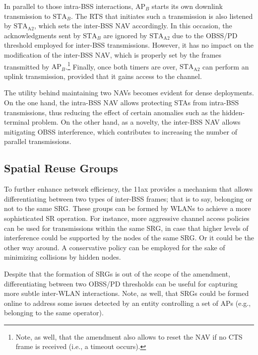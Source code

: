 \documentclass[preprint,12pt]{elsarticle}
\begin{document}
	
	In parallel to those intra-BSS interactions, $\text{AP}_B$ starts its own downlink transmission to $\text{STA}_B$. The RTS that initiates such a transmission is also listened by $\text{STA}_\text{A2}$, which sets the inter-BSS NAV accordingly. In this occasion, the acknowledgments sent by $\text{STA}_B$ are ignored by $\text{STA}_\text{A2}$ due to the OBSS/PD threshold employed for inter-BSS transmissions. However, it has no impact on the modification of the inter-BSS NAV, which is properly set by the frames transmitted by $\text{AP}_B$.\footnote{Note, as well, that the amendment also allows to reset the NAV if no CTS frame is received (i.e., a timeout occurs).} Finally, once both timers are over, $\text{STA}_\text{A2}$ can perform an uplink transmission, provided that it gains access to the channel.
	
	The utility behind maintaining two NAVs becomes evident for dense deployments. On the one hand, the intra-BSS NAV allows protecting STAs from intra-BSS transmissions, thus reducing the effect of certain anomalies such as the hidden-terminal problem. On the other hand, as a novelty, the inter-BSS NAV allows mitigating OBSS interference, which contributes to increasing the number of parallel transmissions. 
	
	\subsection{Spatial Reuse Groups}
	\label{section:srg}
	To further enhance network efficiency, the 11ax provides a mechanism that allows differentiating between two types of inter-BSS frames; that is to say, belonging or not to the same SRG. These groups can be formed by WLANs to achieve a more sophisticated SR operation. For instance, more aggressive channel access policies can be used for transmissions within the same SRG, in case that higher levels of interference could be supported by the nodes of the same SRG. Or it could be the other way around. A conservative policy can be employed for the sake of minimizing collisions by hidden nodes. 
	
	Despite that the formation of SRGs is out of the scope of the amendment, differentiating between two OBSS/PD thresholds can be useful for capturing more subtle inter-WLAN interactions. Note, as well, that SRGs could be formed online to address some issues detected by an entity controlling a set of APs (e.g., belonging to the same operator).
	
\end{document}
